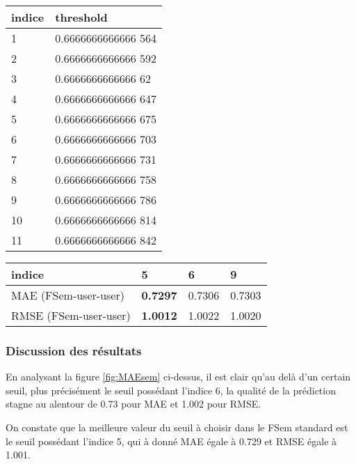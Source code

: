 \begin{table}[H]
	\centering
	\begin{tabular}{|l|l|}
		\hline
		indice & threshold \\ \hline
		1 & 0.6666666666666 564 \\ \hline
		2 & 0.6666666666666 592\\ \hline
		3 & 0.6666666666666 62 \\ \hline
		4 & 0.6666666666666 647 \\ \hline
		5 & 0.6666666666666 675 \\ \hline
		6 & 0.6666666666666 703 \\ \hline
		7 & 0.6666666666666 731 \\ \hline
		8 & 0.6666666666666 758 \\ \hline
		9 & 0.6666666666666 786 \\ \hline
	   10 & 0.6666666666666 814 \\ \hline
	   11 & 0.6666666666666 842 \\ \hline
	\end{tabular}
\end{table}

\begin{center}
	\begin{tabularx}{\textwidth}{|p{5.1cm}|p{3.2cm}|p{3.2cm}|p{3.3cm}|}
		\hline
		indice& 5 & 6 & 9 \\ \hline
		MAE  (FSem-user-user) & \textbf{0.7297} & 0.7306 & 0.7303 \\ \hline
		RMSE (FSem-user-user) & \textbf{1.0012} & 1.0022 & 1.0020\\ \hline
	\end{tabularx}
\end{center}

\subsubsection*{Discussion des résultats}
En analysant la figure \ref{fig:MAEsem} ci-dessus, il est clair qu’au delà d’un certain seuil, plus précisément le seuil possédant l'indice 6, la qualité de la prédiction stagne au alentour de 0.73 pour MAE et 1.002 pour RMSE.

On constate que la meilleure valeur du seuil à choisir dans le FSem standard est le seuil possédant l'indice 5, qui à donné MAE égale à 0.729 et RMSE égale à 1.001.

